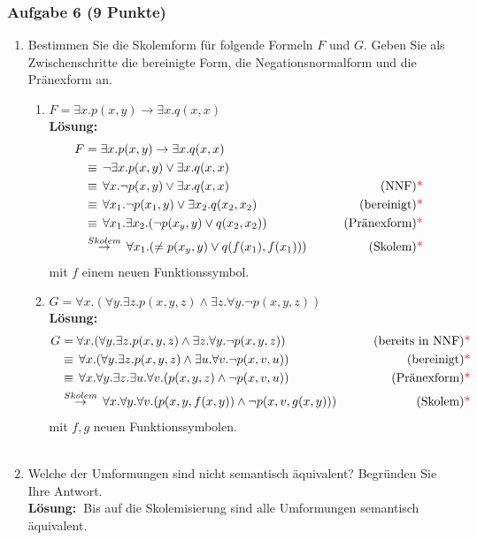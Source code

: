 \documentclass[a4paper,10pt]{article}
\newcommand{\f}[1]{\textbf{#1}}
\newcommand{\LOES}{\f{Lösung:~}}
\begin{document}
\subsubsection*{Aufgabe 6 (9 Punkte)}
\begin{enumerate}
\item Bestimmen Sie die Skolemform für folgende Formeln $F$ und $G$.
Geben Sie als Zwischenschritte die bereinigte Form, die Negationsnormalform und die Pränexform an.
\begin{enumerate}[label=\roman*)]
\item $F = \exists x.p(x,y) \to \exists x.q(x,x)$ \\
\LOES 
\begin{align*}
F &= \exists x.p(x,y) \to \exists x.q(x,x) \\
&\equiv\, \neg \exists x.p(x,y) \lor \exists x.q(x,x) \\
&\equiv\, \forall x.\neg p(x,y) \lor \exists x.q(x,x) \qquad &\text{(NNF){\textcolor{red}{* }}} \\
&\equiv\, \forall x_1.\neg p(x_1,y) \lor \exists x_2.q(x_2,x_2) \qquad &\text{(bereinigt){\textcolor{red}{* }}} \\
&\equiv\, \forall x_1.\exists x_2.(\neg p(x_y,y) \lor q(x_2,x_2)) \qquad &\text{(Pränexform){\textcolor{red}{* }}} \\
&\stackrel{Skolem}{\rightarrow}\, \forall x_1.(\neq p(x_y, y) \lor q(f(x_1), f(x_1))) \qquad &\text{(Skolem){\textcolor{red}{* }}} 
\end{align*}
mit $f$ einem neuen Funktionssymbol. \\
\item $G = \forall x.(\forall y.\exists z.p(x,y,z) \land \exists z.\forall y.\neg p(x,y,z))$ \\
\LOES 
\begin{align*}
G &= \forall x.(\forall y.\exists z.p(x,y,z) \land \exists z.\forall y.\neg p(x,y,z)) \qquad &\text{(bereits in NNF){\textcolor{red}{* }}} \\
&\equiv\, \forall x.(\forall y.\exists z.p(x,y,z) \land \exists u.\forall v.\neg p(x,v,u)) \qquad &\text{(bereinigt){\textcolor{red}{* }}} \\
&\equiv\, \forall x.\forall y.\exists z.\exists u.\forall v.(p(x,y,z) \land \neg p(x,v,u)) \qquad &\text{(Pränexform){\textcolor{red}{* }}} \\
&\stackrel{Skolem}{\rightarrow}\, \forall x.\forall y.\forall v.(p(x,y,f(x,y)) \land \neg p(x,v,g(x,y))) \qquad &\text{(Skolem){\textcolor{red}{* }}} 
\end{align*}
mit $f,g$ neuen Funktionssymbolen.\\\\
\end{enumerate}
\item Welche der Umformungen sind nicht semantisch äquivalent? Begründen Sie Ihre Antwort. \\
\LOES Bis auf die Skolemisierung sind alle Umformungen semantisch äquivalent.\POINT 
\end{enumerate}
\end{document}
